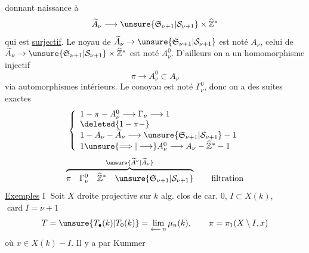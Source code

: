donnant naissance à
\[\widetilde A_\nu\longrightarrow\unsure{\mathfrak S_{\nu+1}|\mathcal S_{\nu+1}}\times\widehat{\mathbb Z}^*\]
qui est \uline{surjectif}. Le noyau de
$\widetilde A_\nu\to\unsure{\mathfrak S_{\nu+1}|\mathcal S_{\nu+1}}$
est noté $A_\nu$, celui de
$\widetilde A_\nu\to\unsure{\mathfrak S_{\nu+1}|\mathcal S_{\nu+1}}\times\widehat{\mathbb Z}^*$
est noté $A_\nu^0$. D'ailleurs on a
un homomorphisme injectif
\[\pi\longrightarrow A_\nu^0\subset A_\nu\]
via automorphismes intérieurs. Le conoyau
est \deleted{$\unsure{\pi}$} noté $\Gamma_\nu^0$, donc on a des
suites exactes
\[\left\{\begin{array}{l}
1\mathbin{-}\pi\mathbin{-}A_\nu^0\longrightarrow\Gamma_\nu\longrightarrow1\\
\deleted{1\mathbin{-}\pi\mathbin{-}}\\
1\mathbin{-}A_\nu\mathbin{-}\widetilde A_\nu\longrightarrow\unsure{\mathfrak S_{\nu+1}|\mathcal S_{\nu+1}}\mathbin{-}1\\
1\unsure{\Longrightarrow|\longrightarrow}A_\nu^0\longrightarrow A_\nu\mathbin{-}\widehat{\mathbb Z}^*\mathbin{-}1
\end{array}\right.\]
\[\overbrace{\pi\quad\Gamma_\nu^0\quad\widehat{\mathbb Z}^*\quad\unsure{\mathfrak S_{\nu+1}|\mathcal S_{\nu+1}}}^{\unsure{\widetilde A^\nu|\widetilde A_\nu}}\qquad\text{filtration}\]
\uline{Exemples} \textcircled{I} Soit $X$ droite projective sur
$k$ alg. clos de car. $0$, $I\subset X(k)$, $\operatorname{card}I=\nu+1$
\[T=\unsure{T_\bullet(k)|T_0(k)}=\lim_{\longleftarrow\,n}\mu_n(k),\qquad\pi=\pi_1(X\setminus I,x)\]
où $x\in X(k)-I$. Il  y a par Kummer

